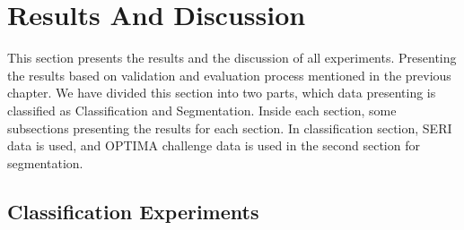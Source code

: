 \chapter{Results And Discussion} \label{chap:results}

This section presents the results and the discussion of all experiments.
Presenting the results based on validation and evaluation process mentioned in the previous chapter.
We have divided this section into two parts, which data presenting is classified as Classification and Segmentation.
Inside each section, some subsections presenting the results for each section.
In classification section, SERI data is used, and OPTIMA challenge data is used in the second section for segmentation.

\section{Classification Experiments}
